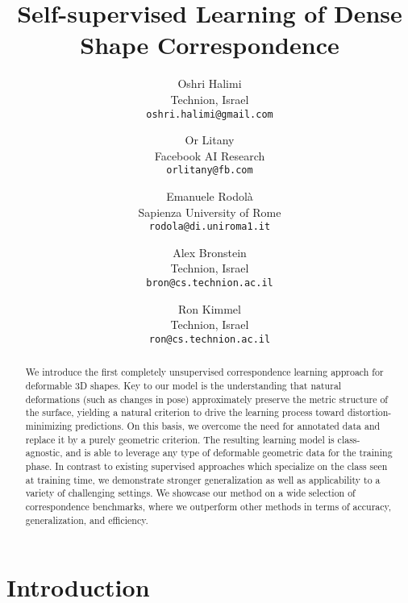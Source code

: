 \documentclass[10pt,twocolumn,letterpaper]{article}
\newcommand\comment[1]{{}}
\begin{document}
\title{
Self-supervised Learning of Dense Shape Correspondence 
}

\author{Oshri Halimi\\
Technion, Israel\\
{\tt\small oshri.halimi@gmail.com}
\and
Or Litany\\
Facebook AI Research\\
{\tt\small orlitany@fb.com}
\and
Emanuele Rodol\`{a}\\
Sapienza University of Rome\\
{\tt\small rodola@di.uniroma1.it}
\and
Alex Bronstein\\
Technion, Israel\\
{\tt\small bron@cs.technion.ac.il}
\and
Ron Kimmel\\
Technion, Israel\\
{\tt\small ron@cs.technion.ac.il}
}

\maketitle

\begin{abstract}
We introduce the first completely unsupervised correspondence learning approach for deformable 3D shapes. 
Key to our model is the understanding that natural deformations (such as changes in pose) approximately preserve the metric structure of the surface, yielding a natural criterion to drive the learning process toward distortion-minimizing predictions. 
On this basis, we overcome the need for annotated data and replace it by a purely geometric criterion. 
The resulting learning model is class-agnostic, and is able to leverage any type of deformable geometric data for the training phase. 
In contrast to existing supervised approaches which specialize on the class seen at training time, we demonstrate stronger generalization as well as applicability to a variety of challenging settings. 
We showcase our method on a wide selection of correspondence benchmarks, where we outperform other methods in terms of accuracy, generalization, and efficiency.
\end{abstract}


\section{Introduction}




\comment{
At the heart of virtual reality and next-generation 3D applications is the modeling of a virtual world to which the user is exposed.
In this context, a basic modeling feature is shape deformability, an inherent characteristic of the real world that should be part of any reasonable design of a virtual reality.
}
\end{document}
